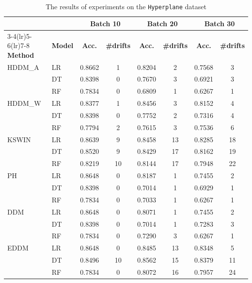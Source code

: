 \begin{table}[h]
    \centering
    \scriptsize
    \caption{The results of experiments on the \texttt{Hyperplane} dataset}
    \label{tab:exp_Hyperplane}
    \begin{tabular}{llcccccc}\toprule
         & & \multicolumn{2}{c}{Batch 10} & \multicolumn{2}{c}{Batch 20} & \multicolumn{2}{c}{Batch 30} \\\cmidrule(lr){3-4}\cmidrule(lr){5-6}\cmidrule(lr){7-8}
         \textbf{Method} & \textbf{Model} & \textbf{Acc.} & \textbf{\#drifts} & \textbf{Acc.} & \textbf{\#drifts} & \textbf{Acc.} & \textbf{\#drifts} \\\midrule
    HDDM\_A  & LR & 0.8662 & 1 & 0.8204 & 2 & 0.7568 & 3 \\
             & DT & 0.8398 & 0 & 0.7670 & 3 & 0.6921 & 3 \\
             & RF & 0.7834 & 0 & 0.6809 & 1 & 0.6267 & 1 \\
    \midrule
    HDDM\_W  & LR & 0.8377 & 1 & 0.8456 & 3 & 0.8152 & 4 \\
             & DT & 0.8398 & 0 & 0.7752 & 2 & 0.7316 & 4 \\
             & RF & 0.7794 & 2 & 0.7615 & 3 & 0.7536 & 6 \\
    \midrule
    KSWIN    & LR & 0.8639 & 9 & 0.8458 & 13 & 0.8285 & 18 \\
             & DT & 0.8520 & 9 & 0.8429 & 17 & 0.8162 & 19 \\
             & RF & 0.8219 & 10 & 0.8144 & 17 & 0.7948 & 22 \\
    \midrule
    PH       & LR & 0.8648 & 0 & 0.8187 & 1 & 0.7455 & 2 \\
             & DT & 0.8398 & 0 & 0.7014 & 1 & 0.6929 & 1 \\
             & RF & 0.7834 & 0 & 0.7033 & 1 & 0.6267 & 1 \\
    \midrule
    DDM      & LR & 0.8648 & 0 & 0.8071 & 1 & 0.7455 & 2 \\
             & DT & 0.8398 & 0 & 0.7014 & 1 & 0.7283 & 3 \\
             & RF & 0.7834 & 0 & 0.7290 & 3 & 0.6267 & 1 \\
    \midrule
    EDDM     & LR & 0.8648 & 0 & 0.8485 & 13 & 0.8348 & 5 \\
             & DT & 0.8496 & 10 & 0.8562 & 15 & 0.8379 & 11 \\
             & RF & 0.7834 & 0 & 0.8072 & 16 & 0.7957 & 24 \\

\end{tabular}
\end{table}
